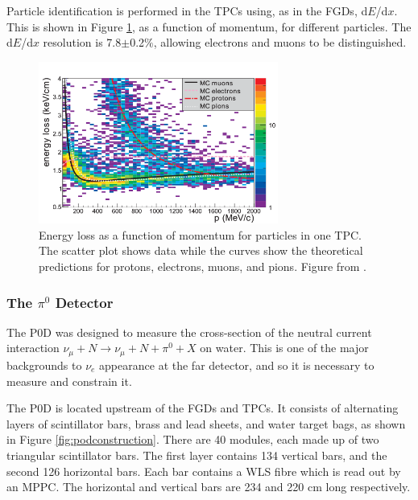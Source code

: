 Particle identification is performed in the TPCs using, as in the FGDs, d$E$/d$x$. This is shown in Figure \ref{fig:tpcpid}, as a function of momentum, for different particles. The d$E$/d$x$ resolution is 7.8$\pm$0.2$\%$, allowing electrons and muons to be distinguished. 

\begin{figure}[!htbp]
\centering
\includegraphics*[width=0.7\textwidth,clip]{figs/tpcpid}
\caption{Energy loss as a function of momentum for particles in one TPC. The scatter plot shows data while the curves show the theoretical predictions for protons, electrons, muons, and pions. Figure from \cite{ABGRALL201125}.} \label{fig:tpcpid}
\end{figure}


\subsubsection{The $\pi^0$ Detector}\label{sec:pod}

The P0D was designed to measure the cross-section of the neutral current interaction $\nu_\mu + N \rightarrow \nu_\mu + N + \pi^0 + X$ on water. This is one of the major backgrounds to $\nu_e$ appearance at the far detector, and so it is necessary to measure and constrain it.

The P0D is located upstream of the FGDs and TPCs. It consists of alternating layers of scintillator bars, brass and lead sheets, and water target bags, as shown in Figure \ref{fig:podconstruction}. There are 40 modules, each made up of two triangular scintillator bars. The first layer contains 134 vertical bars, and the second 126 horizontal bars. Each bar contains a WLS fibre which is read out by an MPPC. The horizontal and vertical bars are 234 and 220 cm long respectively.

